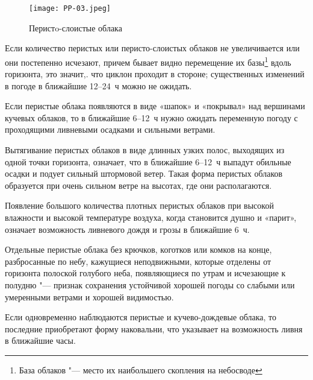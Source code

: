 

\begin{figure}[htb]
  \centering{}
  \texttt{[image: PP-03.jpeg]}
  \caption{Перистo-слоистые облака}
  \label{fig:pp03}
  \small
  \centering{}
\end{figure}

 Если количество перистых или перисто-слоистых облаков не
увеличивается или они постепенно исчезают, причем бывает видно
перемещение их базы\footnote{База облаков "--- место их наибольшего
  скопления на небосводе} вдоль горизонта, это значит,. что циклон
проходит в стороне; существенных изменений в погоде в ближайшие
12--24~ч можно не ожидать.

 Если перистые облака появляются в виде «шапок» и «покрывал» над
вершинами кучевых облаков, то в ближайшие 6--12~ч нужно ожидать
переменную погоду с проходящими ливневыми осадками и сильными ветрами.

 Вытягивание перистых облаков в виде длинных узких полос, выходящих
из одной точки горизонта, означает, что в ближайшие 6--12~ч выпадут
обильные осадки и подует сильный штормовой ветер. Такая форма перистых
облаков образуется при очень сильном ветре на высотах, где они
располагаются.

 Появление большого количества плотных перистых облаков при
высокой влажности и высокой температуре воздуха, когда становится
душно и «парит», означает возможность ливневого дождя и грозы в
ближайшие 6~ч.

 Отдельные перистые облака без крючков, коготков или комков на
конце, разбросанные по небу, кажущиеся неподвижными, которые отделены
от горизонта полоской голубого неба, появляющиеся по утрам и
исчезающие к полудню "--- признак сохранения устойчивой хорошей погоды
со слабыми или умеренными ветрами и хорошей видимостью.

 Если одновременно наблюдаются перистые и кучево-дождевые
облака, то последние приобретают форму наковальни, что указывает на
возможность ливня в ближайшие часы.

